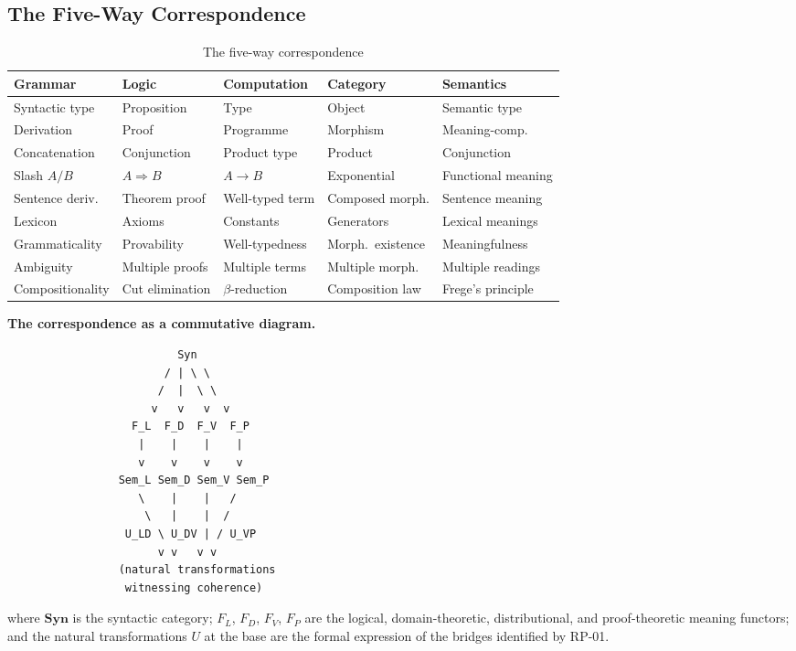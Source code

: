 \documentclass[12pt,a4paper]{article}
\begin{document}
\subsection{The Five-Way Correspondence}

\begin{table}[ht]
\centering
\caption{The five-way correspondence}
\label{tab:fiveway}
\small
\begin{tabular}{@{}lllll@{}}
\toprule
Grammar & Logic & Computation & Category & Semantics \\
\midrule
Syntactic type & Proposition & Type & Object & Semantic type \\
Derivation & Proof & Programme & Morphism & Meaning-comp. \\
Concatenation & Conjunction & Product type & Product & Conjunction \\
Slash $A/B$ & $A \Rightarrow B$ & $A \to B$ & Exponential & Functional meaning \\
Sentence deriv. & Theorem proof & Well-typed term & Composed morph. & Sentence meaning \\
Lexicon & Axioms & Constants & Generators & Lexical meanings \\
Grammaticality & Provability & Well-typedness & Morph.\ existence & Meaningfulness \\
Ambiguity & Multiple proofs & Multiple terms & Multiple morph. & Multiple readings \\
Compositionality & Cut elimination & $\beta$-reduction & Composition law & Frege's principle \\
\bottomrule
\end{tabular}
\end{table}

\textbf{The correspondence as a commutative diagram.}

\begin{verbatim}
                          Syn
                        / | \ \
                       /  |  \ \
                      v   v   v  v
                   F_L  F_D  F_V  F_P
                    |    |    |    |
                    v    v    v    v
                 Sem_L Sem_D Sem_V Sem_P
                    \    |    |   /
                     \   |    |  /
                  U_LD \ U_DV | / U_VP
                       v v   v v
                 (natural transformations
                  witnessing coherence)
\end{verbatim}

\noindent where $\mathbf{Syn}$ is the syntactic category;
$F_L$, $F_D$, $F_V$, $F_P$ are the logical, domain-theoretic, distributional,
and proof-theoretic meaning functors; and the natural transformations $U$ at
the base are the formal expression of the bridges identified by RP-01.
\end{document}
